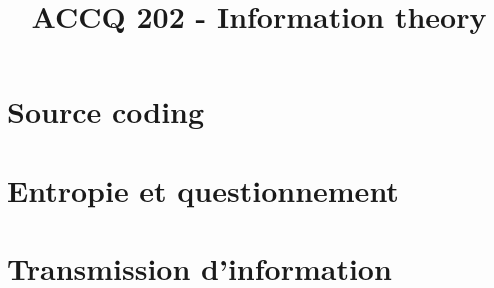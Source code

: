 \documentclass[a4paper,12pt]{article}
\title{\vspace{-1.2cm} \textbf{ACCQ 202 - Information theory}}
\begin{document}
\maketitle

\vspace{-1.5cm}

\section{Source coding}

	

\section{Entropie et questionnement}

	

\section{Transmission d'information}

	


\end{document}
